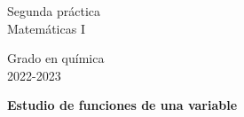\documentclass{article}
\title{\tit}
\author{}
\date{}
\def\tit{Estudio de funciones de una variable}
\begin{document}
\noindent\begin{minipage}{.4\textwidth}
\large
Segunda práctica\\
Matemáticas I
\end{minipage}
\hfill
\begin{minipage}{.4\textwidth}
\large
\flushright
Grado en química\\
2022-2023
\end{minipage}

\bigskip

\begin{center}
\textbf{
\huge
\tit
}
\end{center}







\end{document}
